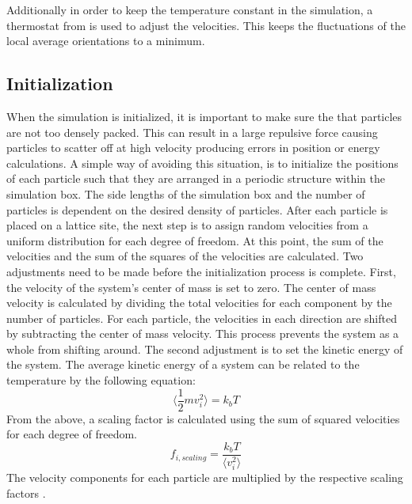 \documentclass[preprint, aps]{revtex4-1}
\begin{document}
Additionally in order to keep the temperature constant in the simulation, a
thermostat from \cite{ilnytskyi02} is used to adjust the velocities. This keeps 
the fluctuations of the local average orientations to a minimum.

\subsection*{Initialization}
When the simulation is initialized, it is important to make sure the that 
particles are not too densely packed. This can result in a large repulsive force
causing particles to scatter off at high velocity producing errors in position 
or energy calculations. A simple way of avoiding this situation, is to 
initialize the positions of each particle such that they are arranged in a 
periodic structure within the simulation box. The side lengths of the simulation
box and the number of particles is dependent on the desired density of
particles. After each particle is placed on a lattice site, the next step is to
assign random velocities from a uniform distribution for each degree of freedom.
At this point, the sum of the velocities and the sum of the squares of the
velocities are calculated. Two adjustments need to be made before the
initialization process is complete. First, the velocity of the system's center
of mass is set to zero. The center of mass velocity is calculated by dividing
the total velocities for each component by the number of particles. For each
particle, the velocities in each direction are shifted by subtracting the center
of mass velocity. This process prevents the system as a whole from shifting
around. The second adjustment is to set the kinetic energy of the system. The
average kinetic energy of a system can be related to the temperature by the 
following equation:
	\begin{equation}
		\langle \frac{1}{2}mv_i^2 \rangle=k_bT
	\end{equation}
From the above, a scaling factor is calculated using the sum of squared 
velocities for each degree of freedom.
	\begin{equation}
		f_{i,scaling}=\frac{k_bT}{\langle v_i^2 \rangle}
	\end{equation}
The velocity components for each particle are multiplied by the respective 
scaling factors \cite{frenkel01}. 
\end{document}
